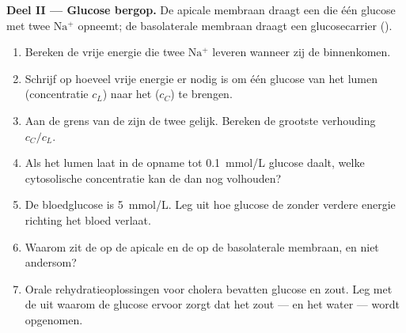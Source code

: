 \begin{problem}
\medskip
\noindent\textbf{Deel II --- Glucose bergop.}
De apicale membraan draagt een  die één glucose met twee
$\mathrm{Na^+}$ opneemt; de basolaterale membraan draagt een glucosecarrier
().
\begin{enumerate}[resume]
  \item Bereken de vrije energie die twee $\mathrm{Na^+}$ leveren wanneer
        zij de  binnenkomen.
  \item Schrijf op hoeveel vrije energie er nodig is om één glucose van het
        lumen (concentratie $c_L$) naar het  ($c_C$) te brengen.
  \item Aan de grens van de  zijn de twee gelijk. Bereken de
        grootste verhouding $c_C/c_L$.
  \item Als het lumen laat in de opname tot \qty{0.1}{mmol/L} glucose
        daalt, welke cytosolische concentratie kan de  dan nog
        volhouden?
  \item De bloedglucose is \qty{5}{mmol/L}. Leg uit hoe glucose de 
        zonder verdere energie richting het bloed verlaat.
  \item Waarom zit de  op de apicale en de  op de
        basolaterale membraan, en niet andersom?
  \item Orale rehydratieoplossingen voor cholera bevatten glucose en zout.
        Leg met de  uit waarom de glucose ervoor zorgt dat het
        zout --- en het water --- wordt opgenomen.
\end{enumerate}


\end{problem}
